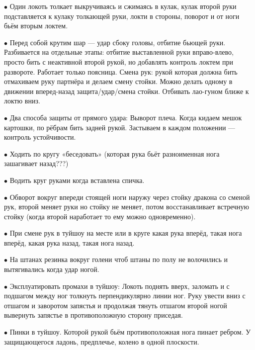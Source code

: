 \item{$\bullet$} Один локоть толкает выкручиваясь и сжимаясь в кулак, кулак второй руки подставляется к кулаку толкающей руки, локти в стороны, поворот и от ноги бьём вторым локтем.

\item{$\bullet$} Перед собой крутим шар --- удар сбоку головы, отбитие бьющей руки. Разбивается на отдельные этапы: отбитие выставленной руки вправо-влево, просто бить с неактивной второй рукой, но добавлять контроль локтем при развороте. Работает только поясница. Смена рук: рукой которая должна бить отмахиваем руку партнёра и делаем смену стойки. Можно делать одному в движении вперед-назад защита/удар/смена стойки. Отбивать лао-гуном ближе к локтю вниз.

\item{$\bullet$} Два способа защиты от прямого удара:
 Выворот плеча.
 Когда кидаем мешок картошки, по рёбрам бить задней рукой.
Застываем в каждом положении --- контроль устойчивости.

\item{$\bullet$} Ходить по кругу «беседовать» (которая рука бьёт разноименная нога зашагивает назад???)

\item{$\bullet$} Водить круг руками когда вставлена спичка.

\item{$\bullet$} Обворот вокруг впереди стоящей ноги наружу через стойку дракона со сменой рук, второй меняет руки но стойку не меняет, потом восстанавливает встречную стойку (когда второй наработает то ему можно одновременно).

\item{$\bullet$} При смене рук в туйшоу на месте или в круге какая рука вперёд, такая нога вперёд, какая рука назад, такая нога назад.

\item{$\bullet$} На штанах резинка вокруг голени чтоб штаны по полу не волочились и вытягивались когда удар ногой.

\item{$\bullet$} Эксплуатировать промахи в туйшоу:
 Локоть поднять вверх, заломать и с подшагом между ног толкнуть перпендикулярно линии ног.
 Руку увести вниз с отшагом и заворотом запястья и продолжая тянуть отшагом второй ногой вывернуть запястье в противоположную сторону приседая.

\item{$\bullet$} Пинки в туйшоу. Которой рукой бьём противоположная нога пинает ребром. У защищающегося ладонь, предплечье, колено в одной плоскости.

